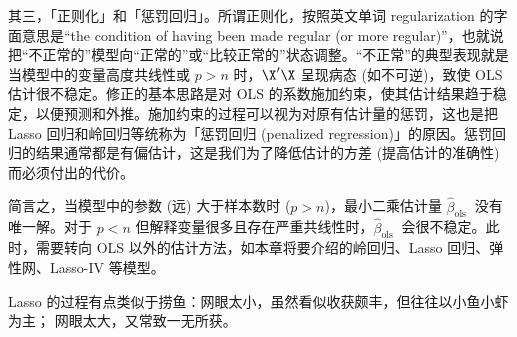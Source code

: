其三，「正则化」和「惩罚回归」。所谓正则化，按照英文单词 regularization 的字面意思是“the condition of having been made regular (or more regular)”，也就说把“不正常的”模型向“正常的”或“比较正常的”状态调整。“不正常”的典型表现就是当模型中的变量高度共线性或 $p>n$ 时，$\X'\X$ 呈现病态 (如不可逆)，致使 OLS 估计很不稳定。修正的基本思路是对 OLS 的系数施加约束，使其估计结果趋于稳定，以便预测和外推。施加约束的过程可以视为对原有估计量的惩罚，这也是把 Lasso 回归和岭回归等统称为「惩罚回归 (penalized regression)」的原因。惩罚回归的结果通常都是有偏估计，这是我们为了降低估计的方差 (提高估计的准确性) 而必须付出的代价。  

简言之，当模型中的参数 (远) 大于样本数时 ($p>n$)，最小二乘估计量 $\widehat{\beta}_{\text {ols }}$ 没有唯一解。对于 $p<n$ 但解释变量很多且存在严重共线性时，$\widehat{\beta}_{\text {ols }}$ 会很不稳定。此时，需要转向 OLS 以外的估计方法，如本章将要介绍的岭回归、Lasso 回归、弹性网、Lasso-IV 等模型。 

Lasso 的过程有点类似于捞鱼：网眼太小，虽然看似收获颇丰，但往往以小鱼小虾为主；%
网眼太大，又常致一无所获。%


\vspace{4pt}


